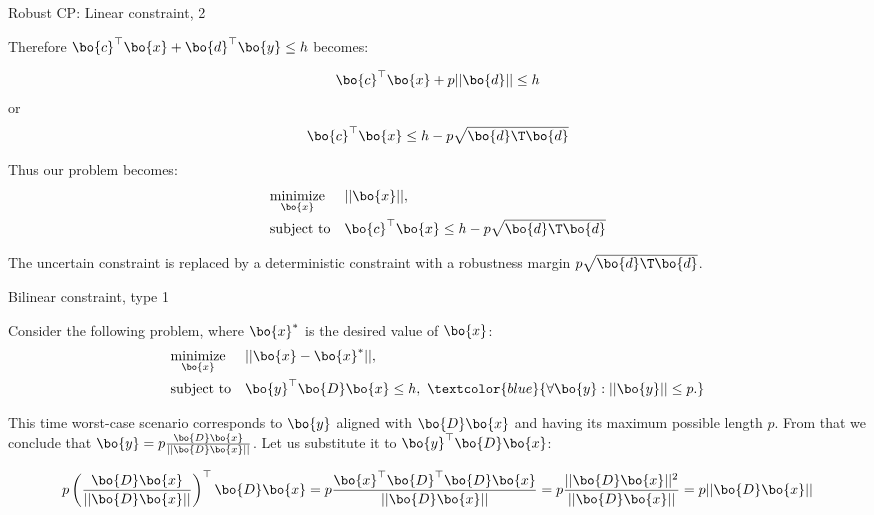 \documentclass{beamer}
\begin{document}
\begin{frame}{Robust CP: Linear constraint, 2}
\begin{flushleft}

Therefore $\bo{c}^\top \bo{x} + \bo{d}^\top \bo{y} \leq h$ becomes:

\begin{align}
    \bo{c}^\top \bo{x} + p || \bo{d} || \leq h 
\end{align}
%
or
%
\begin{align}
	\bo{c}^\top \bo{x} \leq h - p \sqrt{ \bo{d}\T  \bo{d}  } 
\end{align}

\bigskip

Thus our problem becomes:
%
\begin{equation}
\begin{aligned}
& \underset{\bo{x}}{\text{minimize}}
& & ||\bo{x}||, \\
& \text{subject to}
& & \bo{c}^\top \bo{x} \leq h - p \sqrt{ \bo{d}\T  \bo{d}  } 
\end{aligned}
\end{equation}
 
 \bigskip
 
 The uncertain constraint is replaced by a deterministic constraint with a robustness margin $p \sqrt{ \bo{d}\T  \bo{d}  } $.
 
\end{flushleft}
\end{frame}



\begin{frame}{Bilinear constraint, type 1}
\begin{flushleft}

Consider the following problem, where $\bo{x}^*$ is the desired value of $\bo{x}$:
%
\begin{equation}
\begin{aligned}
& \underset{\bo{x}}{\text{minimize}}
& & ||\bo{x} - \bo{x}^*||, \\
& \text{subject to}
& & \bo{y}^\top \bo{D} \bo{x} \leq h, \ 
\textcolor{blue}{
	\forall \bo{y} :  ||\bo{y}|| \leq p.} 
\end{aligned}
\end{equation}

This time worst-case scenario corresponds to $\bo{y}$ aligned with $\bo{D} \bo{x}$ and having its maximum possible length $p$. From that we conclude that $\bo{y} = p \frac{\bo{D} \bo{x}}{|| \bo{D} \bo{x} ||} $. Let us substitute it to $\bo{y}^\top \bo{D} \bo{x}$:

\begin{equation}
    p \left( \frac{\bo{D} \bo{x}}{|| \bo{D} \bo{x} ||} \right)^\top \bo{D} \bo{x} =
    p \frac{\bo{x}^\top \bo{D}^\top \bo{D} \bo{x}}{|| \bo{D} \bo{x} ||} = 
    p \frac{|| \bo{D} \bo{x} ||^2}{|| \bo{D} \bo{x} ||} = 
    p || \bo{D} \bo{x} ||
\end{equation}

 
\end{flushleft}
\end{frame}
\end{document}
